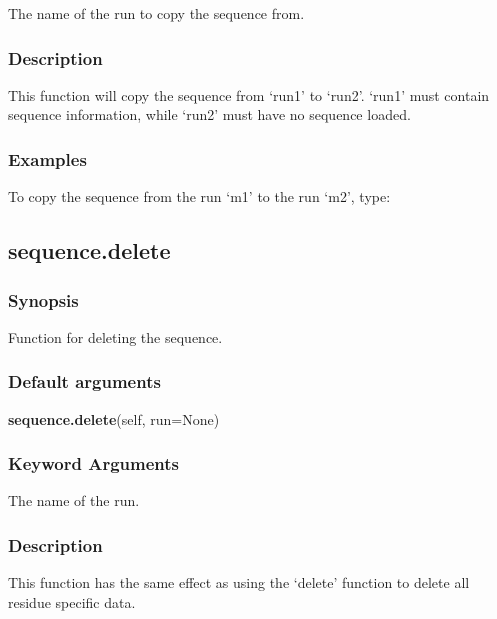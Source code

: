   The name of the run to copy the sequence from.


\subsubsection{Description}

This function will copy the sequence from `run1' to `run2'.  `run1' must contain sequence
information, while `run2' must have no sequence loaded.


\subsubsection{Examples}

To copy the sequence from the run `m1' to the run `m2', type:




\newpage

\subsection{sequence.delete}


\subsubsection{Synopsis}

Function for deleting the sequence.

\subsubsection{Default arguments}

\textsf{\textbf{sequence.delete}(self, run=None)}


\subsubsection{Keyword Arguments}

  The name of the run.

\subsubsection{Description}

This function has the same effect as using the `delete' function to delete all residue
specific data.


\newpage

